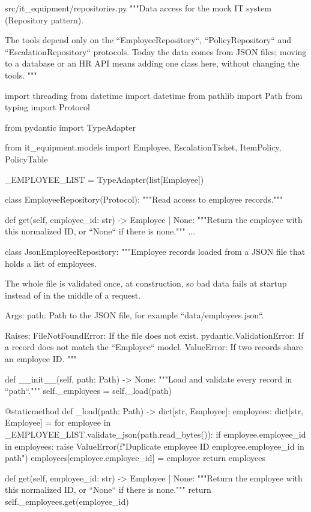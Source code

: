 \documentclass[11pt,letterpaper]{article}
\renewcommand{\_}{\textunderscore\allowbreak}
\begin{document}
\begin{codebox}{src/it_equipment/repositories.py}
"""Data access for the mock IT system (Repository pattern).

The tools depend only on the ``EmployeeRepository``, ``PolicyRepository`` and
``EscalationRepository`` protocols.
Today the data comes from JSON files; moving to a database or an HR API means adding one
class here, without changing the tools.
"""

import threading
from datetime import datetime
from pathlib import Path
from typing import Protocol

from pydantic import TypeAdapter

from it_equipment.models import Employee, EscalationTicket, ItemPolicy, PolicyTable

_EMPLOYEE_LIST = TypeAdapter(list[Employee])


class EmployeeRepository(Protocol):
    """Read access to employee records."""

    def get(self, employee_id: str) -> Employee | None:
        """Return the employee with this normalized ID, or ``None`` if there is none."""
        ...


class JsonEmployeeRepository:
    """Employee records loaded from a JSON file that holds a list of employees.

    The whole file is validated once, at construction, so bad data fails at startup
    instead of in the middle of a request.

    Args:
        path: Path to the JSON file, for example ``data/employees.json``.

    Raises:
        FileNotFoundError: If the file does not exist.
        pydantic.ValidationError: If a record does not match the ``Employee`` model.
        ValueError: If two records share an employee ID.
    """

    def __init__(self, path: Path) -> None:
        """Load and validate every record in ``path``."""
        self._employees = self._load(path)

    @staticmethod
    def _load(path: Path) -> dict[str, Employee]:
        employees: dict[str, Employee] = {}
        for employee in _EMPLOYEE_LIST.validate_json(path.read_bytes()):
            if employee.employee_id in employees:
                raise ValueError(f"Duplicate employee ID {employee.employee_id} in {path}")
            employees[employee.employee_id] = employee
        return employees

    def get(self, employee_id: str) -> Employee | None:
        """Return the employee with this normalized ID, or ``None`` if there is none."""
        return self._employees.get(employee_id)



\end{codebox}
\end{document}
